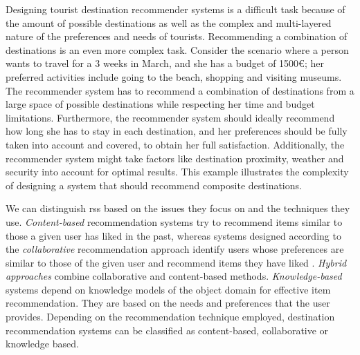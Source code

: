Designing tourist destination recommender systems is a difficult task because of the amount of possible destinations as well as the complex
and multi-layered nature of the preferences and needs of tourists. Recommending a combination of destinations is an even more complex task. Consider the scenario where a person wants to travel for a 3 weeks in March, and she has a budget of 1500€; her preferred activities include going to the beach, shopping and visiting museums. The recommender system has to recommend a combination of destinations from a large space of possible destinations while respecting her time and budget limitations. Furthermore, the recommender system should ideally recommend how long she has to stay in each destination, and her preferences should be fully taken into account and covered, to obtain her full satisfaction. Additionally, the recommender system might take factors like destination proximity, weather and security into account for optimal results. This example illustrates the complexity of designing a system that should recommend composite destinations.

We can distinguish \Glspl{rs}  based on the issues they focus on and the techniques they use.
\textit{Content-based} recommendation systems try to recommend items similar to those a given user has liked in the past, whereas systems
designed according to the \textit{collaborative} recommendation approach identify users
whose preferences are similar to those of the given user and recommend items they
have liked \parencite{Balabanovic1997Content-BasedRecommendation}. \textit{Hybrid approaches} \parencite{Adomavicius2005TowardExtensions} combine collaborative and content-based methods. \textit{Knowledge-based} systems \parencite{Burke2000Knowledge-basedSystems} depend on knowledge models of the object domain for effective item recommendation. They are based on the needs and preferences that the user provides. Depending on the recommendation technique employed, destination recommendation systems can be classified as content-based, collaborative or knowledge based. 



